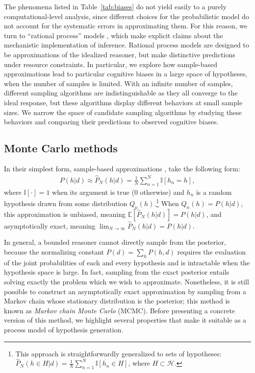 The phenomena listed in Table~\ref{tab:biases} do not yield easily to a purely computational-level analysis, since different choices for the probabilistic model do not account for the systematic errors in approximating them. For this reason, we turn to ``rational process'' models \citep[see][for a review]{Griffiths2012BridgingCognition}, which make explicit claims about the mechanistic implementation of inference. Rational process models are designed to be approximations of the idealized reasoner, but make distinctive predictions under resource constraints. In particular, we explore how sample-based approximations lead to particular cognitive biases in a large space of hypotheses, when the number of samples is limited.
With an infinite number of samples, different sampling algorithms are indistinguishable as they all converge to the ideal response, but these algorithms display different behaviors at small sample sizes. We narrow the space of candidate sampling algorithms by studying these behaviors and comparing their predictions to observed cognitive biases.

\subsection{Monte Carlo methods}

In their simplest form, sample-based approximations \citep[also known as \emph{Monte Carlo} approximations;][]{robert13}, take the following form:
\begin{align}
P(h|d) \approx \hat{P}_N(h|d) = \frac{1}{N}\sum_{n=1}^N \mathbb{I}[h_n=h],
\end{align}
where $\mathbb{I}[\cdot]=1$ when its argument is true (0 otherwise) and $h_n$ is a random hypothesis drawn from some distribution $Q_n(h)$.\footnote{This approach is straightforwardly generalized to sets of hypotheses: $\hat{P}_N(h \in H|d) = \frac{1}{N}\sum_{n=1}^N \mathbb{I}[h_n \in H]$, where $H \subset \mathcal{H}$.} When $Q_n(h) = P(h|d)$, this approximation is unbiased, meaning $\mathbb{E}[\hat{P}_N(h|d)] = P(h|d)$, and asymptotically exact, meaning $\lim_{N\rightarrow \infty} \hat{P}_N(h|d) = P(h|d)$.

In general, a bounded reasoner cannot directly sample from the posterior, because the normalizing constant $P(d) = \sum_{h} P(h,d)$ requires the evaluation of the joint probabilities of each and every hypothesis and is intractable when the hypothesis space is large. In fact, sampling from the exact posterior entails solving exactly the problem which we wish to approximate. Nonetheless, it is still possible to construct an asymptotically exact approximation by sampling from a Markov chain whose stationary distribution is the posterior; this method is known as \emph{Markov chain Monte Carlo} (MCMC). Before presenting a concrete version of this method, we highlight several properties that make it suitable as a process model of hypothesis generation.


